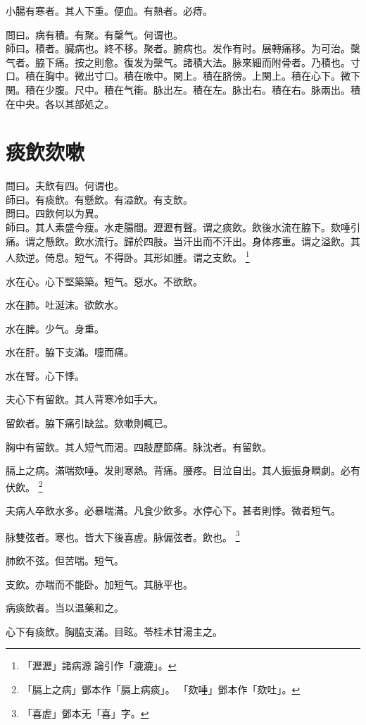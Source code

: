 小腸有寒者。其人下重。便血。有熱者。必痔。

問曰。病有積。有聚。有䅽气。何谓也。\\
師曰。積者。臓病也。終不移。聚者。腑病也。发作有时。展轉痛移。为可治。䅽气者。脇下痛。按之則愈。復发为䅽气。諸積大法。脉來細而附骨者。乃積也。寸口。積在胸中。微出寸口。積在㗋中。関上。積在脐傍。上関上。積在心下。微下関。積在少腹。尺中。積在气衝。脉出左。積在左。脉出右。積在右。脉兩出。積在中央。各以其部処之。

\chapter{痰飲欬嗽}

問曰。夫飲有四。何谓也。\\
師曰。有痰飲。有懸飲。有溢飲。有支飲。\\
問曰。四飲何以为異。\\
師曰。其人素盛今瘦。水走腸間。瀝瀝有聲。谓之痰飲。飲後水流在脇下。欬唾引痛。谓之懸飲。飲水流行。歸於四肢。当汗出而不汗出。身体疼重。谓之溢飲。其人欬逆。倚息。短气。不得卧。其形如腫。谓之支飲。
	\footnote{
		「瀝瀝」諸病源{\sungii 𠊱}論引作「漉漉」。
	}

水在心。心下堅築{\khaai 築}。短气。惡水。不欲飲。

水在肺。吐涎沫。欲飲水。

水在脾。少气。身重。

水在肝。脇下支滿。嚏而痛。

水在腎。心下悸。

夫心下有留飲。其人背寒冷如手大。

留飲者。脇下痛引缺盆。欬嗽則輒已。

胸中有留飲。其人短气而渴。四肢歷節痛。脉沈者。有留飲。

膈上之病。滿喘欬唾。发則寒熱。背痛。腰疼。目泣自出。其人振振身瞤劇。必有伏飲。
	\footnote{
		「膈上之病」鄧本作「膈上病痰」。
		「欬唾」鄧本作「欬吐」。
	}

夫病人卒飲水多。必暴喘滿。凡食少飲多。水停心下。甚者則悸。微者短气。

脉雙弦者。寒也。皆大下後喜虗。脉偏弦者。飲也。
	\footnote{
		「喜虗」鄧本无「喜」字。
	}

肺飲不弦。但苦喘。短气。

支飲。亦喘而不能卧。加短气。其脉平也。

病痰飲者。当以温藥和之。

心下有痰飲。胸脇支滿。目眩。苓桂术甘湯主之。

